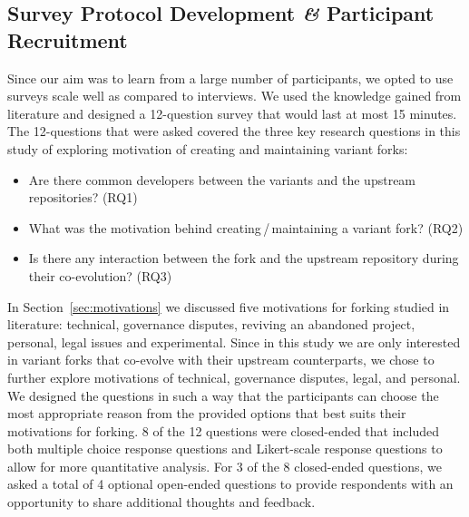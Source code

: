 \subsection{Survey Protocol Development \textit{\&} Participant Recruitment}
\label{sec:protocal}
Since our aim was to learn from a large number of participants, we opted to use surveys scale well as compared to interviews.
We used the knowledge gained from literature and designed a 12-question survey that would last at most 15 minutes. The 12-questions that were asked covered the three key research questions in this study of exploring motivation of creating and maintaining variant forks:

\begin{itemize}
\item Are there common developers between the variants and the upstream repositories? (RQ1)
\item What was the motivation behind creating\,/\,maintaining a variant fork? (RQ2)
\item Is there any interaction between the fork and the upstream repository during their co-evolution? (RQ3)
\end{itemize}

In Section~\ref{sec:motivations} we discussed five motivations for forking studied in literature: technical, governance disputes, reviving an abandoned project, personal, legal issues and experimental. 
Since in this study we are only interested in variant forks that co-evolve with their upstream counterparts, we chose to further explore motivations of technical, governance disputes, legal, and personal. We designed the questions in such a way that the participants can choose the most appropriate reason from the provided options that best suits their motivations for forking. 8 of the 12 questions were closed-ended that included both multiple choice response questions and Likert-scale response questions to allow for more quantitative analysis. For 3 of the 8 closed-ended questions, we asked a total of 4 optional open-ended questions to provide respondents with an opportunity to share additional thoughts and feedback.

